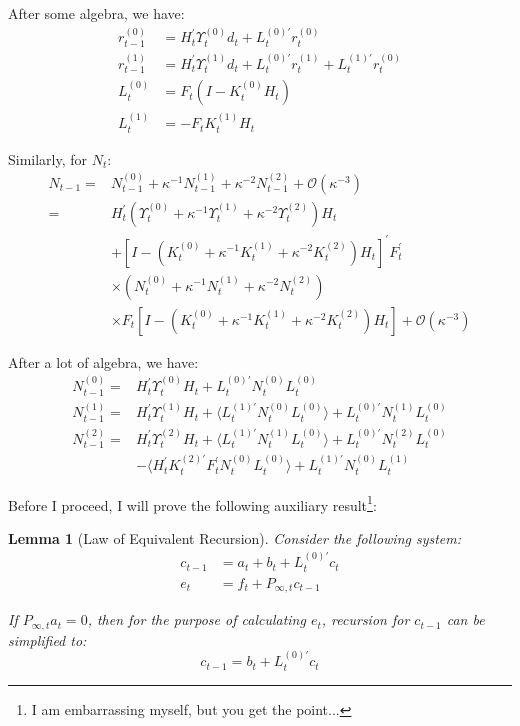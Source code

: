 \documentclass[10pt]{article}
\newtheorem{lemma}{Lemma}
\numberwithin{equation}{section}
\begin{document}
After some algebra, we have:
\begin{align*}
    r_{t-1}^{(0)} &= H_t^{'}\Upsilon_t^{(0)}d_t + L_t^{(0)'}r_t^{(0)} \\
    r_{t-1}^{(1)} &= H_t^{'}\Upsilon_t^{(1)}d_t+L_t^{(0)'}r_t^{(1)} + L_t^{(1)'}r_t^{(0)} \\
    L_t^{(0)} &= F_t(I-K_t^{(0)}H_t) \\
    L_t^{(1)} &= -F_tK_t^{(1)}H_t 
\end{align*}

Similarly, for $N_t$:
\begin{align*}
    N_{t-1} =& N_{t-1}^{(0)} + \kappa^{-1}N_{t-1}^{(1)} + \kappa^{-2}N_{t-1}^{(2)} + \mathcal{O}(\kappa^{-3}) \\
    =& H_t^{'}(\Upsilon_t^{(0)}+\kappa^{-1}\Upsilon_t^{(1)}+\kappa^{-2}\Upsilon_t^{(2)})H_t \\
    &+[I-(K_t^{(0)}+\kappa^{-1}K_t^{(1)}+\kappa^{-2}K_t^{(2)})H_t]^{'}F_t^{'} \\
    &\times(N_t^{(0)}+\kappa^{-1}N_t^{(1)}+\kappa^{-2}N_t^{(2)}) \\
    &\times F_t[I-(K_t^{(0)}+\kappa^{-1}K_t^{(1)}+\kappa^{-2}K_t^{(2)})H_t] + \mathcal{O}(\kappa^{-3})
\end{align*}

After a lot of algebra, we have:
\begin{align*}
    N_{t-1}^{(0)} =& H_t^{'}\Upsilon_t^{(0)}H_t + L_t^{(0)'}N_t^{(0)}L_t^{(0)} \\
    N_{t-1}^{(1)} =& H_t^{'}\Upsilon_t^{(1)}H_t + \langle L_t^{(1)'}N_t^{(0)}L_t^{(0)}\rangle + L_t^{(0)'}N_t^{(1)}L_t^{(0)} \\
    N_{t-1}^{(2)} =& H_t^{'}\Upsilon_t^{(2)}H_t + \langle L_t^{(1)'}N_t^{(1)}L_t^{(0)}\rangle + L_t^{(0)'}N_t^{(2)}L_t^{(0)} \\
    &- \langle H_t^{'}K_t^{(2)'}F_t^{'}N_t^{(0)}L_t^{(0)}\rangle +  L_t^{(1)'}N_t^{(0)}L_t^{(1)}
\end{align*}

Before I proceed, I will prove the following auxiliary result\footnote{I am embarrassing myself, but you get the point...}:
\begin{lemma}[Law of Equivalent Recursion] \label{lem:2}
    Consider the following system:
    \begin{align*}
        c_{t-1} &= a_t + b_t + L_{t}^{(0)'}c_t \\
        e_t &= f_t + P_{\infty,t}c_{t-1}
    \end{align*}

    If $P_{\infty,t}a_t=0$, then for the purpose of calculating $e_t$, recursion for $c_{t-1}$ can be simplified to:
    \[
        c_{t-1} = b_t + L_t^{(0)'}c_t
    \]
\end{lemma}
\end{document}
